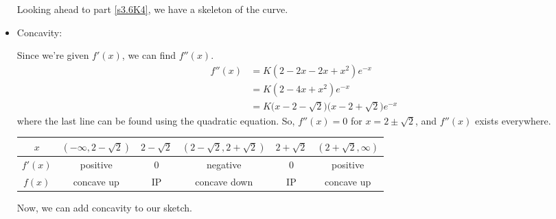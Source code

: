 \begin{solution}
\begin{itemize}
Looking ahead to part \eqref{s3.6K4}, we have a skeleton of the curve.

\begin{center}\end{center}

\item Concavity:

Since we're given $f'(x)$, we can find $f''(x)$.
\begin{align*}
f''(x)&=K(2-2x-2x+x^2)e^{-x}\\
&=K(2-4x+x^2)e^{-x}\\
&=K\big(x-2-\sqrt{2}\big)\big(x-2+\sqrt{2}\big)e^{-x}
\end{align*}
where the last line can be found using the quadratic equation. So,
$f''(x)=0$  for $x=2\pm\sqrt{2}$, and $f''(x)$ exists everywhere.

\begin{center}\begin{tabular}{|c||c|c|c|c|c|}
\hline
$x$&$(-\infty,2-\sqrt{2})$&$2-\sqrt{2}$&$(2-\sqrt{2},2+\sqrt{2})$&$2+\sqrt 2$&$(2+\sqrt 2,\infty)$\\
\hline
$f'(x)$&positive&0&negative&0&positive\\
\hline
$f(x)$& concave up & IP & concave down & IP & concave up\\
\hline
\end{tabular}\end{center}

Now, we can add concavity to our sketch.


\end{itemize}
\end{solution}
